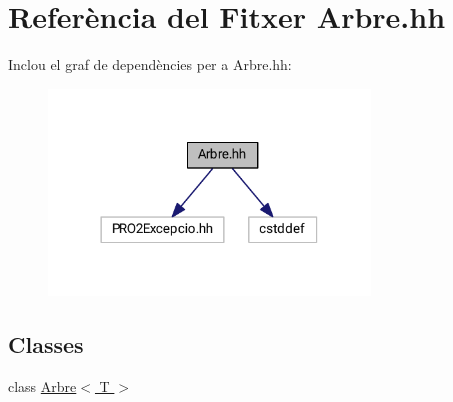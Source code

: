 \hypertarget{_arbre_8hh}{}\section{Referència del Fitxer Arbre.\+hh}
\label{_arbre_8hh}
Inclou el graf de dependències per a Arbre.\+hh\+:\nopagebreak
\begin{figure}[H]
\begin{center}
\leavevmode
\includegraphics[width=242pt]{_arbre_8hh__incl}
\end{center}
\end{figure}
\subsection*{Classes}
\begin{DoxyCompactItemize}
\item 
class \hyperlink{class_arbre}{Arbre$<$ T $>$}
\end{DoxyCompactItemize}
